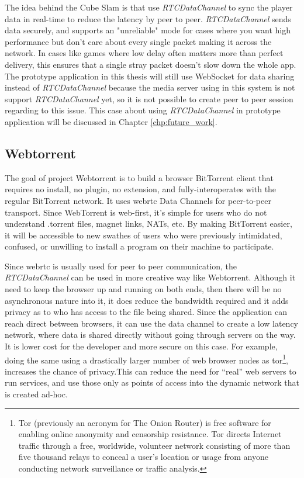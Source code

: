 \par The idea behind the Cube Slam is that use \textit{RTCDataChannel} to sync the player data in real-time to reduce the latency by peer to peer. \textit{RTCDataChannel} sends data securely, and supports an "unreliable" mode for cases where you want high performance but don't care about every single packet making it across the network. In cases like games where low delay often matters more than perfect delivery, this ensures that a single stray packet doesn't slow down the whole app. The prototype application in this thesis will still use WebSocket for data sharing instead of \textit{RTCDataChannel} because the media server using in this system is not support \textit{RTCDataChannel} yet, so it is not possible to create peer to peer session regarding to this issue. This case about using \textit{RTCDataChannel} in prototype application will be discussed in Chapter \ref{chp:future_work}.

\subsection{Webtorrent}

\par The goal of project Webtorrent is to build a browser BitTorrent client that requires no install, no plugin, no extension, and fully-interoperates with the regular BitTorrent network. It uses \gls{webrtc} Data Channels for peer-to-peer transport. Since WebTorrent is web-first, it's simple for users who do not understand .torrent files, magnet links, NATs, etc. By making BitTorrent easier, it will be accessible to new swathes of users who were previously intimidated, confused, or unwilling to install a program on their machine to participate.\cite{github:webtorrent}

\par Since \gls{webrtc} is usually used for peer to peer communication, the \textit{RTCDataChannel} can be used in more creative way like Webtorrent. Although it need to keep the browser up and running on both ends, then there will be no asynchronous nature into it, it does reduce the bandwidth required and it adds privacy as to who has access to the file being shared. Since the application can reach direct between browsers, it can use the data channel to create a low latency network, where data is shared directly without going through servers on the way. It is lower cost for the developer and more secure on this case. For example, doing the same using a drastically larger number of web browser nodes as \gls{tor}\footnote{Tor (previously an acronym for The Onion Router) is free software for enabling online anonymity and censorship resistance. Tor directs Internet traffic through a free, worldwide, volunteer network consisting of more than five thousand relays to conceal a user's location or usage from anyone conducting network surveillance or traffic analysis.\cite{wiki:tor}}, increases the chance of privacy.This can reduce the need for “real” web servers to run services, and use those only as points of access into the dynamic network that is created ad-hoc.

